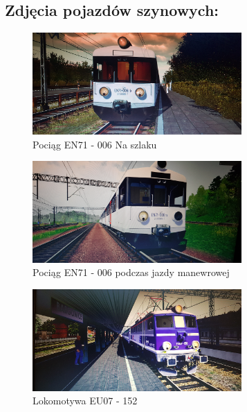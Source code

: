 \subsection{Zdjęcia pojazdów szynowych:}
\begin{center}
\begin{figure}[!ht]
\begin{center}
 \includegraphics[width=8cm]{pictures/Dominik/20210919_185854.jpg}
  \caption{Pociąg EN71 - 006 Na szlaku}
  \label{fig:1}
\end{center}
\end{figure}
\begin{figure}[!ht]
\begin{center}
 \includegraphics[width=8cm]{pictures/Dominik/20210920_224618.jpg}
  \caption{Pociąg EN71 - 006 podczas jazdy manewrowej}
  \label{fig:2}
\end{center}
\end{figure}
\begin{figure}[!ht]
\begin{center}
 \includegraphics[width=8cm]{pictures/Dominik/20210922_232727.jpg}
  \caption{Lokomotywa EU07 - 152}
  \label{fig:3}
\end{center}
\end{figure}
\begin{figure}[!ht]
\begin{center}

\end{center}
\end{figure}
\end{center}
